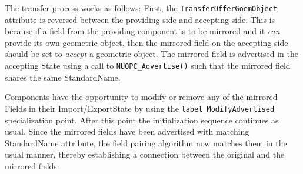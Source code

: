 The transfer process works as follows:  First, the {\tt TransferOfferGoemObject} attribute is reversed between the providing side and accepting side. This is because if a field from the providing component is to be mirrored and it {\em can} provide its own geometric object, then the mirrored field on the accepting side should be set to {\em accept} a geometric object.  The mirrored field is advertised in the accepting State using a call to {\tt NUOPC\_Advertise()} such that the mirrored field shares the same StandardName.

Components have the opportunity to modify or remove any of the mirrored Fields in their Import/ExportState by using the {\tt label\_ModifyAdvertised} specialization point. After this point the initialization sequence continues as usual. Since the mirrored fields have been advertised with matching StandardName attribute, the field pairing algorithm now matches them in the usual manner, thereby establishing a connection between the original and the mirrored fields.
